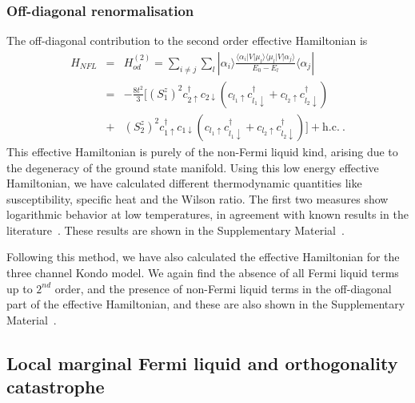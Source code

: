 \documentclass[reprint,prb,superscriptaddress]{revtex4-2}
\begin{document}
\subsubsection{Off-diagonal renormalisation}
The off-diagonal contribution to the second order effective Hamiltonian is 
\begin{eqnarray}
H_{NFL}&=&H^{(2)}_{od} = \sum_{i\neq j} \sum_l |\alpha_i\rangle \frac{\langle \alpha_i  | V| \mu_l \rangle \langle \mu_l  | V| \alpha_j \rangle}{E_0-E_{l}}\langle \alpha_j | \nonumber\\
&=& -\frac{8t^2}{3} [ (S_1^z)^2 c_{2\uparrow}^{\dagger}c_{2\downarrow}  (  c_{l_1\uparrow}c_{l_1\downarrow}^{\dagger} +  c_{l_2\uparrow}c_{l_2\downarrow}^{\dagger}  ) \nonumber\\
&+& (S_2^z)^2 c_{1\uparrow}^{\dagger}c_{1\downarrow}  (  c_{l_1\uparrow}c_{l_1\downarrow}^{\dagger} +  c_{l_2\uparrow}c_{l_2\downarrow}^{\dagger}  ) ] + \textrm{h.c.} ~.
\label{eq:hamiltonian_NFL}
\end{eqnarray}
This effective Hamiltonian is purely of the non-Fermi liquid kind, arising due to the degeneracy of the ground state manifold. Using this low energy effective Hamiltonian, we have calculated different thermodynamic quantities like susceptibility, specific heat and the Wilson ratio. The first two measures show logarithmic behavior at low temperatures, in agreement with known results in the literature~\cite{Noz_blandin_1980,Gan_Andrei_Coleman_1993,emery_kivelson,Gan_mchannel_1994,
Tsvelick_Weigmann_mchannel_1984,Tsvelick_weigmann_mchannel_1985,parcollet_olivier_large_N,
kimura_taro_Su_N_kondo,PhysRevB.73.224445,cox_jarrell_two_channel_rev,affleck_1991_overscreen,
Coleman_tsvelik,affleck1993exact,coleman_pepin_2003,roch_nicolas_costi_2009,schiller_avraham_2008,
Durganandini_2011}. These results are shown in the Supplementary Material~\cite{SM}. 

Following this method, we have also calculated the effective Hamiltonian for the three channel Kondo model. We again find the absence of all Fermi liquid terms up to $2^{nd}$ order, and the presence of non-Fermi liquid terms in the off-diagonal part of the effective Hamiltonian, and these are also shown in the Supplementary Material~\cite{SM}.

\subsection{Local marginal Fermi liquid and orthogonality catastrophe}
\label{sec:MFL}
\end{document}
